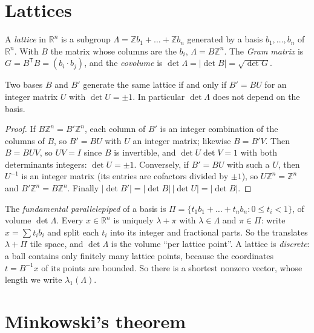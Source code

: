 \section{Lattices}

\begin{definition}
A \emph{lattice} in $\mathbb R^n$ is a subgroup $\Lambda=\mathbb Zb_1+\dots+\mathbb Zb_n$ generated by a basis $b_1,\dots,b_n$ of $\mathbb R^n$. With $B$ the
matrix whose columns are the $b_i$, $\Lambda=B\mathbb Z^n$. The \emph{Gram matrix} is $G=B^{\mathsf T}B=(b_i\cdot b_j)$, and the \emph{covolume} is
$\det\Lambda=|\det B|=\sqrt{\det G}$.
\end{definition}

\begin{proposition}\label{geometry:prop:latticebases}
Two bases $B$ and $B'$ generate the same lattice if and only if $B'=BU$ for an integer matrix $U$ with $\det U=\pm1$. In particular $\det\Lambda$ does not
depend on the basis.
\end{proposition}

\begin{proof}
If $B\mathbb Z^n=B'\mathbb Z^n$, each column of $B'$ is an integer combination of the columns of $B$, so $B'=BU$ with $U$ an integer matrix; likewise $B=B'V$. Then
$B=BUV$, so $UV=I$ since $B$ is invertible, and $\det U\det V=1$ with both determinants integers: $\det U=\pm1$. Conversely, if $B'=BU$ with such a $U$, then
$U^{-1}$ is an integer matrix (its entries are cofactors divided by $\pm1$), so $U\mathbb Z^n=\mathbb Z^n$ and $B'\mathbb Z^n=B\mathbb Z^n$. Finally
$|\det B'|=|\det B|\,|\det U|=|\det B|$.
\end{proof}

The \emph{fundamental parallelepiped} of a basis is $\Pi=\{t_1b_1+\dots+t_nb_n:0\le t_i<1\}$, of volume $\det\Lambda$. Every $x\in\mathbb R^n$ is uniquely
$\lambda+\pi$ with $\lambda\in\Lambda$ and $\pi\in\Pi$: write $x=\sum t_ib_i$ and split each $t_i$ into its integer and fractional parts. So the translates
$\lambda+\Pi$ tile space, and $\det\Lambda$ is the volume ``per lattice point''. A lattice is \emph{discrete}: a ball contains only finitely many lattice
points, because the coordinates $t=B^{-1}x$ of its points are bounded. So there is a shortest nonzero vector, whose length we write $\lambda_1(\Lambda)$.

\section{Minkowski's theorem}

